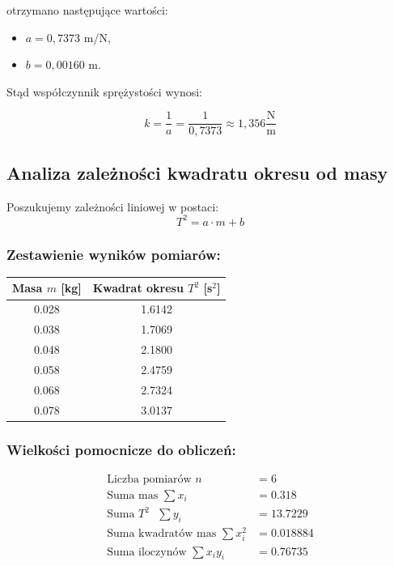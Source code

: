 \documentclass[a4paper,12pt]{article}
\begin{document}
otrzymano następujące wartości:
\begin{itemize}
    \setlength{\itemsep}{0em}
    \item $a = 0,7373$ m/N,
    \item $b = 0,00160$ m.
\end{itemize}

Stąd współczynnik sprężystości wynosi:

\begin{equation*}
    k = \frac{1}{a} = \frac{1}{0{,}7373} \approx 1{,}356 \frac{\text{N}}{\text{m}}
\end{equation*}



\subsection{Analiza zależności kwadratu okresu od masy}

Poszukujemy zależności liniowej w postaci:
\[
    T^2 = a \cdot m + b
\]

\subsubsection*{Zestawienie wyników pomiarów:}
\begin{center}
    \begin{tabular}{|c|c|}
        \hline
        Masa $m$ [kg] & Kwadrat okresu $T^2$ [s$^2$] \\
        \hline
        0.028 & 1.6142 \\
        \hline
        0.038 & 1.7069 \\
        \hline
        0.048 & 2.1800 \\
        \hline
        0.058 & 2.4759 \\
        \hline
        0.068 & 2.7324 \\
        \hline
        0.078 & 3.0137 \\
        \hline
    \end{tabular}
\end{center}

\subsubsection*{Wielkości pomocnicze do obliczeń:}

\begin{align*}
    \text{Liczba pomiarów }n             & = 6        \\
    \text{Suma mas }\sum x_i             & = 0.318    \\
    \text{Suma }T^2\text{ }\sum y_i      & = 13.7229  \\
    \text{Suma kwadratów mas }\sum x_i^2 & = 0.018884 \\
    \text{Suma iloczynów }\sum x_i y_i   & = 0.76735  \\
\end{align*}
\end{document}
